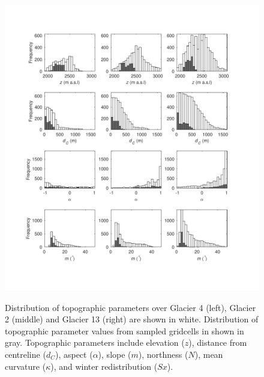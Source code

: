 \documentclass[twocolumn, letterpaper]{igs}
\begin{document}
\begin{figure}
	\centering
	\includegraphics[width =\textwidth]{TopoParamsSampled1.pdf}\\
	\caption{Distribution of topographic parameters over Glacier 4 (left), Glacier 2 (middle) and Glacier 13 (right) are shown in white. Distribution of topographic parameter values from sampled gridcells in shown in gray. Topographic parameters include elevation ($z$), distance from centreline ($d_C$), aspect ($\alpha$), slope ($m$), northness ($N$), mean curvature ($\kappa$), and winter redistribution ($Sx$).}
	\label{fig:TopoParamsSampled1}
\end{figure}
\end{document}
